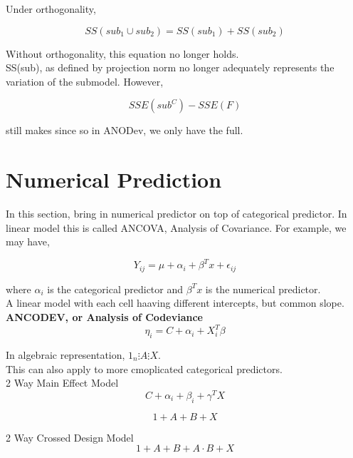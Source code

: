 \documentclass[11pt,fleqn]{book} %
\begin{document}
Under orthogonality, 

		$$SS(sub_1 \cup sub_2)  = SS(sub_1) + SS(sub_2)$$

Without orthogonality, this equation no longer holds. \\

SS(sub), as defined by projection norm no longer adequately represents the variation of the submodel. However, 

		$$SSE(sub^C) - SSE(F) $$

still makes since so in ANODev, we only have the full. 

\section{Numerical Prediction}

In this section, bring in numerical predictor on top of categorical predictor. In linear model this is called ANCOVA, Analysis of Covariance. For example, we may have,

		$$Y_{ij} = \mu + \alpha_i + \beta^T x + \epsilon_{ij} $$

where $\alpha_i$ is the categorical predictor and $\beta^T x$ is the numerical predictor.\\

A linear model with each cell haaving different intercepts, but common slope. \\



\textbf{ANCODEV, or Analysis of Codeviance}\\


		$$\eta_i = C + \alpha_i + X_i^T \beta $$

In algebraic representation, $ 1_n \vdots A \vdots X$.\\

This can also apply to more cmoplicated categorical predictors. \\


2 Way Main Effect Model  \\

		$$C + \alpha_i + \beta_i + \gamma^T X $$

		$$ 1 + A + B + X $$

2 Way Crossed Design Model \\

		$$1 + A + B + A\cdot B + X $$
\end{document}
